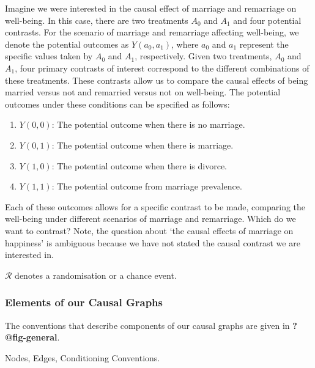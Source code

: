 \documentclass[
  single column]{article}
\providecommand{\tightlist}{%
  \setlength{\itemsep}{0pt}\setlength{\parskip}{0pt}}\usepackage{longtable,booktabs,array}
\begin{document}
Imagine we were interested in the causal effect of marriage and
remarriage on well-being. In this case, there are two treatments \(A_0\)
and \(A_1\) and four potential contrasts. For the scenario of marriage
and remarriage affecting well-being, we denote the potential outcomes as
\(Y(a_0, a_1)\), where \(a_0\) and \(a_1\) represent the specific values
taken by \(A_0\) and \(A_1\), respectively. Given two treatments,
\(A_0\) and \(A_1\), four primary contrasts of interest correspond to
the different combinations of these treatments. These contrasts allow us
to compare the causal effects of being married versus not and remarried
versus not on well-being. The potential outcomes under these conditions
can be specified as follows:

\begin{enumerate}
\def\labelenumi{\arabic{enumi}.}
\tightlist
\item
  \(Y(0, 0)\): The potential outcome when there is no marriage.
\item
  \(Y(0, 1)\): The potential outcome when there is marriage.
\item
  \(Y(1, 0)\): The potential outcome when there is divorce.
\item
  \(Y(1, 1)\): The potential outcome from marriage prevalence.
\end{enumerate}

Each of these outcomes allows for a specific contrast to be made,
comparing the well-being under different scenarios of marriage and
remarriage. Which do we want to contrast? Note, the question about `the
causal effects of marriage on happiness' is ambiguous because we have
not stated the causal contrast we are interested in.

\(\mathcal{R}\) denotes a randomisation or a chance event.

\subsubsection{Elements of our Causal
Graphs}\label{elements-of-our-causal-graphs}

The conventions that describe components of our causal graphs are given
in \textbf{?@fig-general}.

\begin{table}

\caption{\label{tbl-general}Nodes, Edges, Conditioning Conventions.}

\centering{

\terminologygeneral

}

\end{table}%
\end{document}
